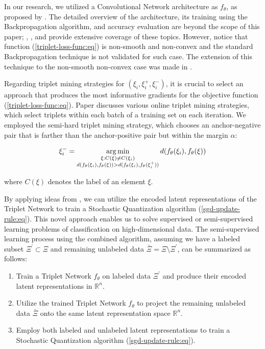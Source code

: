 In our research, we utilized a Convolutional Network architecture as $f_{\theta}$, as proposed by \cite{Lecun_1998}. The detailed overview of the architecture, its training using the Backpropagation algorithm, and accuracy evaluation are beyond the scope of this paper; \cite{Beohar_2021}, \cite{Krizhevsky_2012}, and \cite{Lecun_1998} provide extensive coverage of these topics. However, notice that function (\ref{triplet-loss-func:eq}) is non-smooth and non-convex and the standard Backpropagation technique is not validated for such case. The extension of this technique to the non-smooth non-convex case was made in \cite{Norkin_2021}.

Regarding triplet mining strategies for $(\xi_i, \xi^{+}_i, \xi^{-}_i)$, it is crucial to select an approach that produces the most informative gradients for the objective function (\ref{triplet-loss-func:eq}). Paper \cite{xuan2020} discusses various online triplet mining strategies, which select triplets within each batch of a training set on each iteration. We employed the semi-hard triplet mining strategy, which chooses an anchor-negative pair that is farther than the anchor-positive pair but within the margin $\alpha$:

\begin{equation}
    \label{semi-hard-triplet-mining:eq}
    \xi^{-}_i = \operatorname*{arg\,min}_{\substack{\xi: C(\xi) \neq C(\xi_i) \\ d(f_{\theta}(\xi_i), f_{\theta}(\xi)) > d(f_{\theta}(\xi_i), f_{\theta}(\xi^{+}_i))}} d(f_{\theta}(\xi_i), f_{\theta}(\xi))
\end{equation}

\noindent where $C(\xi)$ denotes the label of an element $\xi$.

By applying ideas from \cite{Hoffer_2015,MURASAKI_ANDO_SHIMAMURA_2022,Turpault_Serizel_Vincent_2019}, we can utilize the encoded latent representations of the Triplet Network to train a Stochastic Quantization  algorithm (\ref{sgd-update-rule:eq}). This novel approach enables us to solve supervised or semi-supervised learning problems of classification on high-dimensional data. The semi-supervised learning process using the combined algorithm, assuming we have a labeled subset $\Xi^\prime \subset \Xi$ and remaining unlabeled data $\bar{\Xi}=\Xi\setminus \Xi^\prime$, can be summarized as follows:

\begin{enumerate}
    \item Train a Triplet Network $f_{\theta}$ on labeled data $\Xi^\prime$ and produce their encoded latent representations in $\mathbb{R}^n$.
    \item Utilize the trained Triplet Network $f_{\theta}$ to project the remaining unlabeled data $\bar{\Xi}$ onto the same latent representation space $\mathbb{R}^n$.
    \item Employ both labeled and unlabeled latent representations to train a Stochastic Quantization  algorithm (\ref{sgd-update-rule:eq}).
\end{enumerate}
